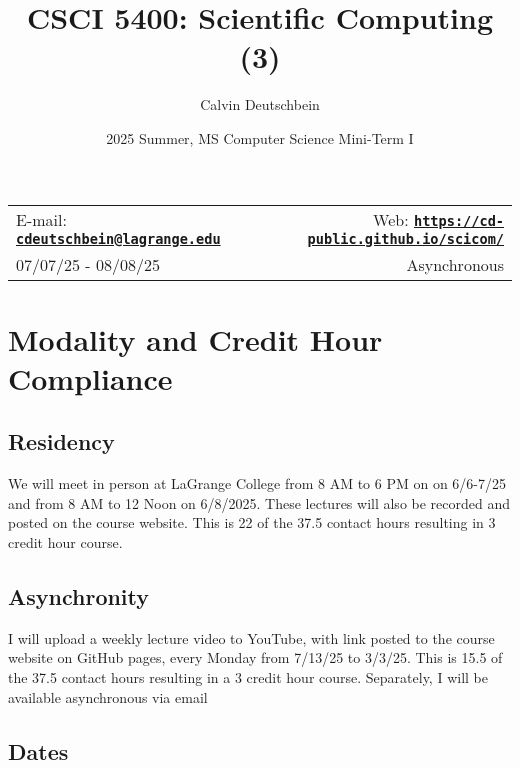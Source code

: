 \documentclass[11pt]{article}
\title{CSCI 5400: Scientific Computing (3)}
\author{Calvin Deutschbein}
\date{2025 Summer, MS Computer Science Mini-Term I}
\newcommand{\blankline}{\quad\pagebreak[2]}
\begin{document}
\maketitle

\blankline

\begin{tabular*}{\textwidth}{@{\extracolsep{\fill}}lr}


E-mail: \href{mailto:cdeutschbein@lagrange.edu}{\tt\bf cdeutschbein@lagrange.edu} & Web: \href{https://cd-public.github.io/scicom/}{\tt\bf https://cd-public.github.io/scicom/}  \\

07/07/25 - 08/08/25 &  Asynchronous \\
\hline
\end{tabular*}

\vspace{5 mm}


\section*{Modality and Credit Hour Compliance}

\subsection*{Residency}  

We will meet in person at LaGrange College from 8 AM to 6 PM on on 6/6-7/25
and from 8 AM to 12 Noon on 6/8/2025. These lectures will also be recorded and posted on
the course website. This is 22 of the 37.5 contact hours resulting in 3 credit hour course.

\subsection*{Asynchronity} 

I will upload a weekly lecture video to YouTube, with link posted to the course
website on GitHub pages, every Monday from 7/13/25 to 3/3/25. This is 15.5 of the 37.5 contact
hours resulting in a 3 credit hour course. Separately, I will be available asynchronous via email

\subsection*{Dates}
\end{document}
